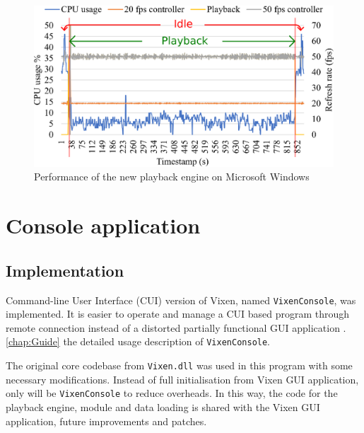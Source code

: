 \begin{figure}[t]
  \centering
  \includegraphics[width=0.8\columnwidth]{Figs/playback.eps}
  \caption{\footnotesize Performance of the new playback engine on Microsoft Windows}
  \label{fig:playback}
\end{figure}

\section{Console application}

\subsection{Implementation}

 Command-line User Interface (CUI) version of Vixen, named \texttt{VixenConsole}, was implemented. It is easier to operate and manage a CUI based program through remote connection  instead of a distorted partially functional GUI application . \cref{chap:Guide}  the detailed usage description of \texttt{VixenConsole}.


The original core codebase from \texttt{Vixen.dll} was used in this program with some necessary modifications. Instead of full initialisation from Vixen GUI application, only  will be  \texttt{VixenConsole} to reduce overheads. In this way, the code for the playback engine, module and data loading is  shared with the Vixen GUI application,  future improvements and patches.

